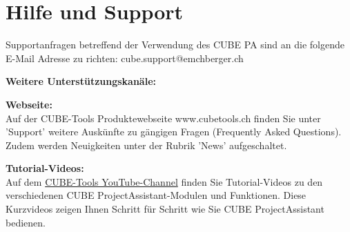 
\clearpage
\section{Hilfe und Support}
\label{bkm:Ref443502661}

Supportanfragen betreffend der Verwendung des CUBE PA sind an die folgende E-Mail Adresse zu richten: {\color{red} cube.support@emchberger.ch}

\vspace{\baselineskip}

\textbf{\large Weitere Unterstützungskanäle:}

\vspace{\baselineskip}

\textbf{Webseite:}\\

Auf der CUBE-Tools Produktewebseite {\color{blue} www.cubetools.ch} finden Sie unter 'Support' weitere Auskünfte zu gängigen Fragen (Frequently Asked Questions). Zudem werden Neuigkeiten unter der Rubrik 'News' aufgeschaltet.

\vspace{\baselineskip}

\textbf{Tutorial-Videos:}\\

Auf dem  \href{https://www.youtube.com/channel/UCYWA8nERo4vTPYWP0WJ32hw}{\color{blue} CUBE-Tools YouTube-Channel} finden Sie Tutorial-Videos zu den verschiedenen CUBE ProjectAssistant-Modulen und Funktionen. Diese Kurzvideos zeigen Ihnen Schritt für Schritt wie Sie CUBE ProjectAssistant bedienen.